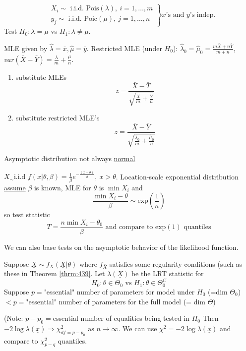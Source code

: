 \documentclass[english, 11pt]{article}
\newcommand{\lp}{\left(}
\newcommand{\rp}{\right)}
\begin{document}
\begin{exmp}\label{exmp:531}
$$
\left.\begin{aligned}
&X_i\sim\text{ i.i.d. Pois}(\lambda), ~i=1, \dots, m\\
&y_j\sim \text{ i.i.d. Poic}(\mu), ~j=1, \dots, n
\end{aligned}\right\}
x\text{'s and }y\text{'s indep.}
$$
Test $H_0:\lambda=\mu$ vs $H_1:\lambda\not=\mu$.

MLE given by $\hat{\lambda}=\bar{x}, \hat{\mu}=\bar{y}$. Restricted MLE (under $H_0$): $\hat{\lambda}_0=\hat{\mu}_0=\frac{m\bar{X}+n\bar{Y}}{m+n}$, $var(\bar{X}-\bar{Y})=\frac{\lambda}{m}+\frac{\mu}{n}$.
\begin{enumerate}
\item substitute MLEs
$$
z=\frac{\bar{X}-\bar{T}}{\sqrt{\frac{\bar{X}}{m}+\frac{\bar{Y}}{n}}}
$$
\item substitute restricted MLE's
$$
z=\frac{\bar{X}-\bar{Y}}{\sqrt{\frac{\hat{\lambda}_0}{m}+\frac{\hat{\mu}_0}{n}}}
$$
\end{enumerate}
Asymptotic distribution not always \underline{normal}
\end{exmp}

\begin{exmp}
$X_\sim \text{i.i.d }f(x|\theta, \beta)=\frac{1}{\beta}e^{-\frac{(x-\theta)}{\beta}}, ~x>\theta$. Location-scale exponential distribution \underline{assume} $\beta$ is known, MLE for $\theta$ is $\min X_i$ and 
$$
\frac{\min X_i-\theta}{\beta}\sim \text{exp}\lp\frac{1}{n}\rp
$$
so test statistic
$$
T=\frac{n\min X_i-\theta_0}{\beta} \text{ and compare to exp}(1)\text{ quantiles}
$$
\end{exmp}

\vspace{10 mm}

We can also base tests on the asymptotic behavior of the likelihood function.

\vspace{10 mm}

\begin{thrm}\label{thrm:532} 
Suppose $\underline{X}\sim f_X(\underline{X}|\theta)$ where $f_{\bar{X}}$ satisfies some regularity conditions (such as these in Theorem \ref{thrm:439}. Let $\lambda(\underline{X})$ be the LRT statistic for 
$$
H_0:\theta\in\Theta_0\text{ vs }H_1:\theta\in\Theta_0^C
$$
Suppose $p=$"essential" number of parameters for model under $H_0$ (=dim $\Theta_0$)$<p=$"essential" number of parameters for the full model (= dim $\Theta$)

(Note: $p-p_0=$essential number of equalities being tested in $H_0$ Then $-2\log\lambda(\underline{x})\Rightarrow\chi^2_{df={p-p_0}}\text{ as }n\rightarrow\infty$. We can use $\chi^2=-2\log\lambda(\underline{x})$ and compare to $\chi^2_{p-q}$ quantiles.
\end{thrm}
\end{document}

